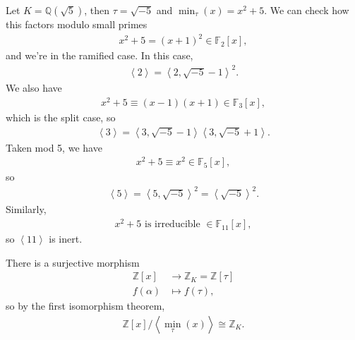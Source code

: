 \begin{example}

Let \(K = {\mathbb{Q}}( \sqrt{5} )\), then \(\tau= \sqrt{-5}\) and
\(\min_\tau(x) = x^2 + 5\). We can check how this factors modulo small
primes
\begin{align*}
x^2 + 5 = (x+1)^2 \in {\mathbb{F}}_2[x]
,\end{align*}
and we're in the ramified case. In this case,
\begin{align*}
\left\langle{ 2 }\right\rangle = \left\langle{ 2, \sqrt{ -5} -1 }\right\rangle^2  
.\end{align*}
We also have
\begin{align*}
x^2 + 5 \equiv (x-1)(x+1) \in {\mathbb{F}}_3[x]
,\end{align*}
which is the split case, so
\begin{align*}
\left\langle{ 3 }\right\rangle= \left\langle{ 3, \sqrt{-5} -1 }\right\rangle \left\langle{ 3, \sqrt{-5} + 1 }\right\rangle   
.\end{align*}
Taken mod 5, we have
\begin{align*}
x^2 + 5 \equiv x^2 \in {\mathbb{F}}_5[x]
,\end{align*}
so
\begin{align*}
\left\langle{ 5 }\right\rangle = \left\langle{ 5, \sqrt{-5} }\right\rangle^2 = \left\langle{ \sqrt{-5} }\right\rangle ^2 
.\end{align*}
Similarly,
\begin{align*}
x^2 + 5 \text{ is irreducible } \in {\mathbb{F}}_{11}[x]
,\end{align*}
so \(\left\langle{ 11 }\right\rangle\) is inert.

\end{example}

\begin{lemma}

There is a surjective morphism
\begin{align*}
{\mathbb{Z}}[x] &\to {\mathbb{Z}}_K = {\mathbb{Z}}[ \tau ] \\
f( \alpha) &\mapsto f( \tau)
,\end{align*}
so by the first isomorphism theorem,
\begin{align*}
{\mathbb{Z}}[x] / \left\langle{ \min_\tau(x) }\right\rangle \cong {\mathbb{Z}}_K 
.\end{align*}

\end{lemma}

